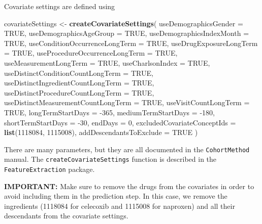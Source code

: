\documentclass[]{article}
\newenvironment{Shaded}{\begin{snugshade}}{\end{snugshade}}
\newcommand{\DataTypeTok}[1]{\textcolor[rgb]{0.13,0.29,0.53}{#1}}
\newcommand{\DecValTok}[1]{\textcolor[rgb]{0.00,0.00,0.81}{#1}}
\newcommand{\KeywordTok}[1]{\textcolor[rgb]{0.13,0.29,0.53}{\textbf{#1}}}
\newcommand{\NormalTok}[1]{#1}
\newcommand{\OtherTok}[1]{\textcolor[rgb]{0.56,0.35,0.01}{#1}}
\newcommand{\StringTok}[1]{\textcolor[rgb]{0.31,0.60,0.02}{#1}}
\begin{document}
Covariate settings are defined using

\begin{Shaded}
\begin{Highlighting}[]
\NormalTok{covariateSettings <-}
\StringTok{  }\KeywordTok{createCovariateSettings}\NormalTok{(}
    \DataTypeTok{useDemographicsGender =} \OtherTok{TRUE}\NormalTok{,}
    \DataTypeTok{useDemographicsAgeGroup =} \OtherTok{TRUE}\NormalTok{,}
    \DataTypeTok{useDemographicsIndexMonth =} \OtherTok{TRUE}\NormalTok{,}
    \DataTypeTok{useConditionOccurrenceLongTerm =} \OtherTok{TRUE}\NormalTok{,}
    \DataTypeTok{useDrugExposureLongTerm =} \OtherTok{TRUE}\NormalTok{,}
    \DataTypeTok{useProcedureOccurrenceLongTerm =} \OtherTok{TRUE}\NormalTok{,}
    \DataTypeTok{useMeasurementLongTerm =} \OtherTok{TRUE}\NormalTok{,}
    \DataTypeTok{useCharlsonIndex =} \OtherTok{TRUE}\NormalTok{,}
    \DataTypeTok{useDistinctConditionCountLongTerm =} \OtherTok{TRUE}\NormalTok{,}
    \DataTypeTok{useDistinctIngredientCountLongTerm =} \OtherTok{TRUE}\NormalTok{,}
    \DataTypeTok{useDistinctProcedureCountLongTerm =} \OtherTok{TRUE}\NormalTok{,}
    \DataTypeTok{useDistinctMeasurementCountLongTerm =} \OtherTok{TRUE}\NormalTok{,}
    \DataTypeTok{useVisitCountLongTerm =} \OtherTok{TRUE}\NormalTok{,}
    \DataTypeTok{longTermStartDays =} \DecValTok{-365}\NormalTok{,}
    \DataTypeTok{mediumTermStartDays =} \DecValTok{-180}\NormalTok{,}
    \DataTypeTok{shortTermStartDays =} \DecValTok{-30}\NormalTok{,}
    \DataTypeTok{endDays =} \DecValTok{0}\NormalTok{,}
    \DataTypeTok{excludedCovariateConceptIds =} \KeywordTok{list}\NormalTok{(}\DecValTok{1118084}\NormalTok{, }\DecValTok{1115008}\NormalTok{),}
    \DataTypeTok{addDescendantsToExclude =} \OtherTok{TRUE}
\NormalTok{  )}
\end{Highlighting}
\end{Shaded}

There are many parameters, but they are all documented in the
\texttt{CohortMethod} manual. The \texttt{createCovariateSettings}
function is described in the \texttt{FeatureExtraction} package.

\textbf{IMPORTANT:} Make sure to remove the drugs from the covariates in
order to avoid including them in the prediction step. In this case, we
remove the ingredients (1118084 for celecoxib and 1115008 for naproxen)
and all their descendants from the covariate settings.
\end{document}
